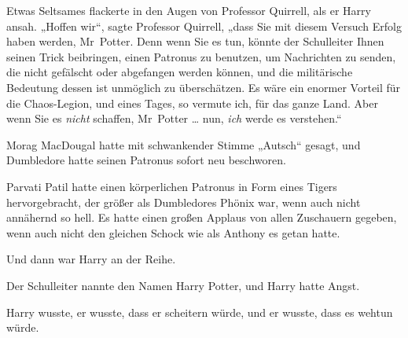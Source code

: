 Etwas Seltsames flackerte in den Augen von Professor Quirrell, als er Harry ansah.
„Hoffen wir“, sagte Professor Quirrell, „dass Sie mit diesem Versuch Erfolg haben werden, Mr~Potter. Denn wenn Sie es tun, könnte der Schulleiter Ihnen seinen Trick beibringen, einen Patronus zu benutzen, um Nachrichten zu senden, die nicht gefälscht oder abgefangen werden können, und die militärische Bedeutung dessen ist unmöglich zu überschätzen. Es wäre ein enormer Vorteil für die Chaos-Legion, und eines Tages, so vermute ich, für das ganze Land. Aber wenn Sie es \emph{nicht} schaffen, Mr~Potter … nun, \emph{ich} werde es verstehen.“

\later

Morag MacDougal hatte mit schwankender Stimme
„Autsch“ gesagt, und Dumbledore hatte seinen Patronus sofort neu beschworen.

Parvati Patil hatte einen körperlichen Patronus in Form eines Tigers hervorgebracht, der größer als Dumbledores Phönix war, wenn auch nicht annähernd so hell. Es hatte einen großen Applaus von allen Zuschauern gegeben, wenn auch nicht den gleichen Schock wie als Anthony es getan hatte.

Und dann war Harry an der Reihe.

Der Schulleiter nannte den Namen Harry Potter, und Harry hatte Angst.

Harry wusste, er wusste, dass er scheitern würde, und er wusste, dass es wehtun würde.

